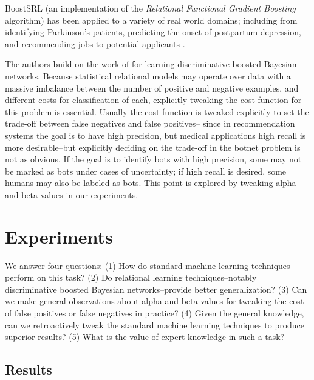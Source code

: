 \documentclass[letterpaper]{article}
\begin{document}
BoostSRL (an implementation of the \textit{Relational Functional Gradient Boosting} algorithm) has been applied to a variety of real world domains; including from identifying Parkinson's patients, predicting the onset of postpartum depression, and recommending jobs to potential applicants \cite{dhami2017identifying,natarajan2017boosting,yang2017combining}.

The authors build on the work of \cite{ramanan2017discriminative,yang2014learning} for learning discriminative boosted Bayesian networks.  Because statistical relational models may operate over data with a massive imbalance between the number of positive and negative examples, and different costs for classification of each, explicitly tweaking the cost function for this problem is essential.  Usually the cost function is tweaked explicitly to set the trade-off between false negatives and false positives-- since in recommendation systems the goal is to have high precision, but medical applications high recall is more desirable--but explicitly deciding on the trade-off in the botnet problem is not as obvious.  If the goal is to identify bots with high precision, some may not be marked as bots under cases of uncertainty; if high recall is desired, some humans may also be labeled as bots. This point is explored by tweaking alpha and beta values in our experiments.

\section{Experiments}

We answer four questions: (1) How do standard machine learning techniques perform on this task? (2) Do relational learning techniques--notably discriminative boosted Bayesian networks--provide better generalization? (3) Can we make general observations about alpha and beta values for tweaking the cost of false positives or false negatives in practice? (4) Given the general knowledge, can we retroactively tweak the standard machine learning techniques to produce superior results? (5) What is the value of expert knowledge in such a task?

\subsection{Results}
\end{document}
